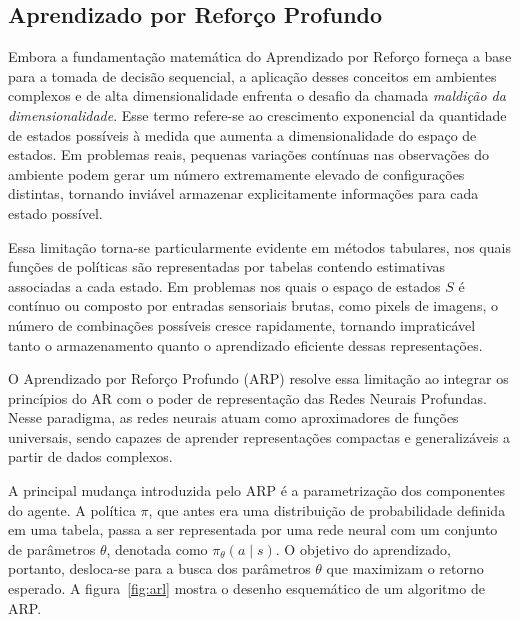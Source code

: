 

\subsection{Aprendizado por Reforço Profundo}
\label{subsec:aprendizado-por-reforco-profundo}

Embora a fundamentação matemática do Aprendizado por Reforço forneça a base para a tomada de decisão sequencial, a aplicação desses conceitos em ambientes complexos e de alta dimensionalidade enfrenta o desafio da chamada \textit{maldição da dimensionalidade}. Esse termo refere-se ao crescimento exponencial da quantidade de estados possíveis à medida que aumenta a dimensionalidade do espaço de estados. Em problemas reais, pequenas variações contínuas nas observações do ambiente podem gerar um número extremamente elevado de configurações distintas, tornando inviável armazenar explicitamente informações para cada estado possível.

Essa limitação torna-se particularmente evidente em métodos tabulares, nos quais funções de políticas são representadas por tabelas contendo estimativas associadas a cada estado. Em problemas nos quais o espaço de estados $S$ é contínuo ou composto por entradas sensoriais brutas, como pixels de imagens, o número de combinações possíveis cresce rapidamente, tornando impraticável tanto o armazenamento quanto o aprendizado eficiente dessas representações.

O Aprendizado por Reforço Profundo (ARP) \cite{mnih-2013}  resolve essa limitação ao integrar os princípios do AR com o poder de representação das Redes Neurais Profundas. Nesse paradigma, as redes neurais atuam como aproximadores de funções universais, sendo capazes de aprender representações compactas e generalizáveis a partir de dados complexos.

A principal mudança introduzida pelo ARP é a parametrização dos componentes do agente. A política $\pi$, que antes era uma distribuição de probabilidade definida em uma tabela, passa a ser representada por uma rede neural com um conjunto de parâmetros $\theta$, denotada como $\pi_\theta(a \mid s)$. O objetivo do aprendizado, portanto, desloca-se para a busca dos parâmetros $\theta$ que maximizam o retorno esperado. A figura~\ref{fig:arl} mostra o desenho esquemático de um algoritmo de ARP.

